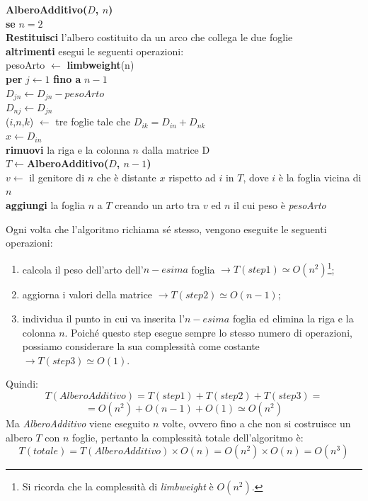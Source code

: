 \begin{framed}\noindent
  \textbf{AlberoAdditivo($D$, $n$)}\\
  \textbf{se} $n=2$\\
  \indent \textbf{Restituisci} l'albero costituito da un arco che collega le due foglie\\
  \textbf{altrimenti} esegui le seguenti operazioni: \\
  pesoArto $\leftarrow$ \textbf{limbweight}(n)\\
  \textbf{per} $j \leftarrow 1$ \textbf{fino a} $n-1$\\
  \indent $D_{jn} \leftarrow D_{jn} - pesoArto$\\
  \indent $D_{nj} \leftarrow D_{jn}$\\
  ($i$,$n$,$k$) $\leftarrow$ tre foglie tale che $D_{ik}=D_{in}+D_{nk}$\\
  $x \leftarrow D_{in}$\\
  \textbf{rimuovi} la riga e la colonna $n$ dalla matrice D \\
  $T \leftarrow $\textbf{AlberoAdditivo($D$, $n-1$)}\\
  $v \leftarrow $ il genitore di $n$ che è distante $x$ rispetto ad $i$ in $T$, dove $i$ è la foglia vicina di $n$\\
  \textbf{aggiungi} la foglia $n$ a $T$ creando un arto tra $v$ ed $n$ il cui peso è \textit{pesoArto}
\end{framed}
Ogni volta che l'algoritmo richiama sé stesso, vengono eseguite le seguenti operazioni:
\begin{enumerate}
	\item calcola il peso dell'arto dell'$n-esima$ foglia $\rightarrow T(step 1) \simeq O(n^2)$\footnote{Si ricorda che la complessità di \textit{limbweight} è $O(n^2)$.};
	\item aggiorna i valori della matrice $\rightarrow T(step 2) \simeq O(n-1)$;
	\item individua il punto in cui va inserita l'$n-esima$ foglia ed elimina la riga e la colonna $n$. Poiché questo step esegue sempre lo stesso numero di operazioni, possiamo considerare la sua complessità come costante $\rightarrow  T(step 3) \simeq O(1)$.  
\end{enumerate} 
Quindi:
\[T(AlberoAdditivo)=T(step 1)+T(step 2)+T(step 3)=\]
\[=O(n^2)+O(n-1)+O(1) \simeq O(n^2)\]
Ma \textit{AlberoAdditivo} viene eseguito $n$ volte, ovvero fino a che non si costruisce un albero $T$ con $n$ foglie, pertanto la complessità totale dell'algoritmo è:
\[T(totale)=T(AlberoAdditivo) \times O(n)=O(n^2) \times O(n)= O(n^3)\]

